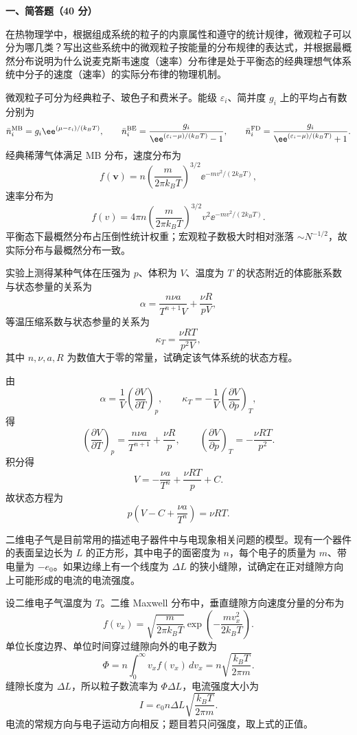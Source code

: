 ﻿

\textbf{一、简答题（40 分）}

\begin{question}
在热物理学中，根据组成系统的粒子的内禀属性和遵守的统计规律，微观粒子可以分为哪几类？写出这些系统中的微观粒子按能量的分布规律的表达式，并根据最概然分布说明为什么说麦克斯韦速度（速率）分布律是处于平衡态的经典理想气体系统中分子的速度（速率）的实际分布律的物理机制。
\begin{solution}
微观粒子可分为经典粒子、玻色子和费米子。能级 $\varepsilon_i$、简并度 $g_i$ 上的平均占有数分别为
\[
\bar n_i^{\rm MB}=g_i \ee^{(\mu-\varepsilon_i)/(k_BT)},\qquad
\bar n_i^{\rm BE}=\frac{g_i}{\ee^{(\varepsilon_i-\mu)/(k_BT)}-1},\qquad
\bar n_i^{\rm FD}=\frac{g_i}{\ee^{(\varepsilon_i-\mu)/(k_BT)}+1}.
\]
经典稀薄气体满足 MB 分布，速度分布为
\[
f(\mathbf v)=n\left(\frac{m}{2\pi k_BT}\right)^{3/2}\ee^{-mv^2/(2k_BT)},
\]
速率分布为
\[
f(v)=4\pi n\left(\frac{m}{2\pi k_BT}\right)^{3/2}v^2\ee^{-mv^2/(2k_BT)}.
\]
平衡态下最概然分布占压倒性统计权重；宏观粒子数极大时相对涨落 $\sim N^{-1/2}$，故实际分布与最概然分布一致。
\end{solution}
\end{question}

\begin{question}
实验上测得某种气体在压强为 $p$、体积为 $V$、温度为 $T$ 的状态附近的体膨胀系数与状态参量的关系为
\[
\alpha=\frac{n\nu a}{T^{n+1}V}+\frac{\nu R}{pV},
\]
等温压缩系数与状态参量的关系为
\[
\kappa_T=\frac{\nu RT}{p^2V},
\]
其中 $n,\nu,a,R$ 为数值大于零的常量，试确定该气体系统的状态方程。
\begin{solution}
由
\[
\alpha=\frac1V\left(\frac{\partial V}{\partial T}\right)_p,
\qquad
\kappa_T=-\frac1V\left(\frac{\partial V}{\partial p}\right)_T,
\]
得
\[
\left(\frac{\partial V}{\partial T}\right)_p
=\frac{n\nu a}{T^{n+1}}+\frac{\nu R}{p},
\qquad
\left(\frac{\partial V}{\partial p}\right)_T
=-\frac{\nu RT}{p^2}.
\]
积分得
\[
V=-\frac{\nu a}{T^n}+\frac{\nu RT}{p}+C.
\]
故状态方程为
\[
p\left(V-C+\frac{\nu a}{T^n}\right)=\nu RT.
\]
\end{solution}
\end{question}

\begin{question}
二维电子气是目前常用的描述电子器件中与电现象相关问题的模型。现有一个器件的表面呈边长为 $L$ 的正方形，其中电子的面密度为 $n$，每个电子的质量为 $m$、带电量为 $-e_0$。如果边缘上有一个线度为 $\Delta L$ 的狭小缝隙，试确定在正对缝隙方向上可能形成的电流的电流强度。
\begin{solution}
设二维电子气温度为 $T$。二维 Maxwell 分布中，垂直缝隙方向速度分量的分布为
\[
f(v_x)=\sqrt{\frac{m}{2\pi k_BT}}\exp\left(-\frac{mv_x^2}{2k_BT}\right).
\]
单位长度边界、单位时间穿过缝隙向外的电子数为
\[
\Phi=n\int_0^\infty v_x f(v_x)\,dv_x
=n\sqrt{\frac{k_BT}{2\pi m}}.
\]
缝隙长度为 $\Delta L$，所以粒子数流率为 $\Phi\Delta L$，电流强度大小为
\[
I=e_0 n\Delta L\sqrt{\frac{k_BT}{2\pi m}}.
\]
电流的常规方向与电子运动方向相反；题目若只问强度，取上式的正值。
\end{solution}
\end{question}

